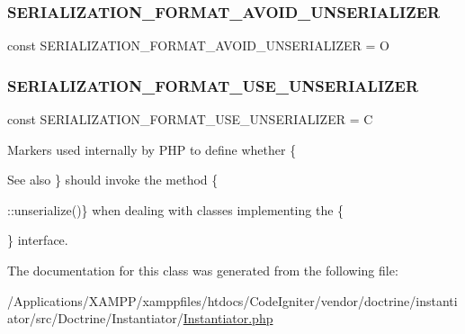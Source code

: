 \subsubsection{\texorpdfstring{S\+E\+R\+I\+A\+L\+I\+Z\+A\+T\+I\+O\+N\+\_\+\+F\+O\+R\+M\+A\+T\+\_\+\+A\+V\+O\+I\+D\+\_\+\+U\+N\+S\+E\+R\+I\+A\+L\+I\+Z\+ER}{SERIALIZATION\_FORMAT\_AVOID\_UNSERIALIZER}}
{\footnotesize\ttfamily const S\+E\+R\+I\+A\+L\+I\+Z\+A\+T\+I\+O\+N\+\_\+\+F\+O\+R\+M\+A\+T\+\_\+\+A\+V\+O\+I\+D\+\_\+\+U\+N\+S\+E\+R\+I\+A\+L\+I\+Z\+ER = \textquotesingle{}O\textquotesingle{}}

\mbox{\label{class_doctrine_1_1_instantiator_1_1_instantiator_a45a4fd0bf9c3d3c3109a607ae37fdb7d}} 
\subsubsection{\texorpdfstring{S\+E\+R\+I\+A\+L\+I\+Z\+A\+T\+I\+O\+N\+\_\+\+F\+O\+R\+M\+A\+T\+\_\+\+U\+S\+E\+\_\+\+U\+N\+S\+E\+R\+I\+A\+L\+I\+Z\+ER}{SERIALIZATION\_FORMAT\_USE\_UNSERIALIZER}}
{\footnotesize\ttfamily const S\+E\+R\+I\+A\+L\+I\+Z\+A\+T\+I\+O\+N\+\_\+\+F\+O\+R\+M\+A\+T\+\_\+\+U\+S\+E\+\_\+\+U\+N\+S\+E\+R\+I\+A\+L\+I\+Z\+ER = \textquotesingle{}C\textquotesingle{}}

Markers used internally by P\+HP to define whether \{\begin{DoxySeeAlso}{See also}
\} should invoke the method \{

\+::unserialize()\} when dealing with classes implementing the \{

\} interface. 
\end{DoxySeeAlso}


The documentation for this class was generated from the following file\+:\begin{DoxyCompactItemize}
\item 
/\+Applications/\+X\+A\+M\+P\+P/xamppfiles/htdocs/\+Code\+Igniter/vendor/doctrine/instantiator/src/\+Doctrine/\+Instantiator/\mbox{\hyperlink{_instantiator_8php}{Instantiator.\+php}}\end{DoxyCompactItemize}
